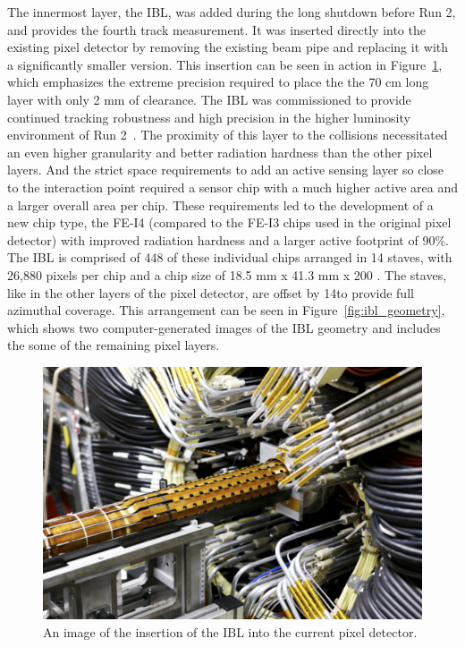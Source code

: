 The innermost layer, the \ac{IBL}, was added during the long shutdown before Run 2, and provides the fourth track measurement.
It was inserted directly into the existing pixel detector by removing the existing beam pipe and replacing it with a significantly smaller version.
This insertion can be seen in action in Figure~\ref{fig:ibl_insertion}, which emphasizes the extreme precision required to place the the 70 cm long layer with only 2 mm of clearance.
The \ac{IBL} was commissioned to provide continued tracking robustness and high precision in the higher luminosity environment of Run 2~\cite{ibl_tdr}.
The proximity of this layer to the collisions necessitated an even higher granularity and better radiation hardness than the other pixel layers.
And the strict space requirements to add an active sensing layer so close to the interaction point required a sensor chip with a much higher active area and a larger overall area per chip.
These requirements led to the development of a new chip type, the FE-I4 (compared to the FE-I3 chips used in the original pixel detector) with improved radiation hardness and a larger active footprint of 90\%.
The \ac{IBL} is comprised of 448 of these individual chips arranged in 14 staves, with 26,880 pixels per chip and a chip size of 18.5 mm x 41.3 mm x 200 \um.
The staves, like in the other layers of the pixel detector, are offset by 14\textdegree to provide full azimuthal coverage.
This arrangement can be seen in Figure~\ref{fig:ibl_geometry}, which shows two computer-generated images of the \ac{IBL} geometry and includes the some of the remaining pixel layers.


\begin{figure}[hbtp]
\centering
\includegraphics[width=\fullfig]{figures/ibl_insertion.jpg}
\caption{An image of the insertion of the \ac{IBL} into the current pixel detector.}
\label{fig:ibl_insertion}
\end{figure}


